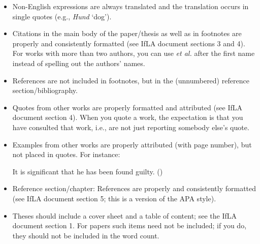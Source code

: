 \documentclass[11pt,fleqn,a4paper/thesis]{article}
\newcommand{\6}{\mbox{$[\hspace*{-.6mm}[$}}
\newcommand{\9}{\mbox{$]\hspace*{-.6mm}]$}}
\begin{document}
\begin{itemize}[itemsep=-1pt,leftmargin=2.5ex,topsep=-2pt]
\item Non-English expressions are always translated and the translation occurs in single quotes (e.g., {\em Hund} `dog').

\item Citations in the main body of the paper/thesis as well as in footnotes are properly and consistently formatted (see IfLA document sections 3 and 4). For works with more than two authors, you can use {\em et al.} after the first name instead of spelling out the authors' names. 

\item References are not included in footnotes, but in the (unnumbered) reference section/bibliography.

\item Quotes from other works are properly formatted and attributed (see IfLA document section 4). When you quote a work, the expectation is that you have consulted that work, i.e., are not just reporting somebody else's quote.

\item Examples from other works are properly attributed (with page number), but not placed in quotes. For instance:

\begin{exe}
\ex It is significant that he has been found guilty. \hfill (\citealt[144]{kiparsky-kiparsky70})
\end{exe}

\item Reference section/chapter: References are properly and consistently formatted (see IfLA document section 5; this is a version of the APA style).

\item Theses should include a cover sheet and a table of content; see the IfLA document section 1. For papers such items need not be included; if you do, they should not be included in the word count.

\end{itemize}
	


\end{document}
